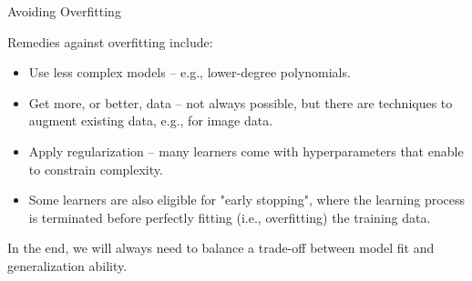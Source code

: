 \begin{vbframe}{Avoiding Overfitting}

Remedies against overfitting include:
\begin{itemize}
  \item Use less complex models -- e.g., lower-degree polynomials. 
  \item Get more, or better, data -- not always possible, but there are 
  techniques to augment existing data, e.g., for image data.
  \item Apply regularization -- many learners come with hyperparameters that 
  enable to constrain complexity.
  \item Some learners are also eligible for "early stopping", where the 
  learning process is terminated before perfectly fitting (i.e., overfitting) 
  the training data.
\end{itemize}

\lz

In the end, we will always need to balance a trade-off between model fit 
and generalization ability.

\end{vbframe}





